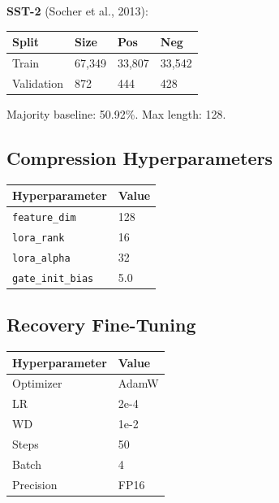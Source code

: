 \textbf{SST-2} (Socher et al., 2013):

\begin{table}[H]
\centering
\small
\begin{tabular}{llll}
\toprule
\textbf{Split} & \textbf{Size} & \textbf{Pos} & \textbf{Neg} \\
\midrule
Train & 67,349 & 33,807 & 33,542 \\
Validation & 872 & 444 & 428 \\
\bottomrule
\end{tabular}
\end{table}

Majority baseline: 50.92\%. Max length: 128.

\subsection{Compression Hyperparameters}

\begin{table}[H]
\centering
\small
\begin{tabular}{ll}
\toprule
\textbf{Hyperparameter} & \textbf{Value} \\
\midrule
\texttt{feature\_dim} & 128 \\
\texttt{lora\_rank} & 16 \\
\texttt{lora\_alpha} & 32 \\
\texttt{gate\_init\_bias} & 5.0 \\
\bottomrule
\end{tabular}
\end{table}

\subsection{Recovery Fine-Tuning}

\begin{table}[H]
\centering
\small
\begin{tabular}{ll}
\toprule
\textbf{Hyperparameter} & \textbf{Value} \\
\midrule
Optimizer & AdamW \\
LR & 2e-4 \\
WD & 1e-2 \\
Steps & 50 \\
Batch & 4 \\
Precision & FP16 \\
\bottomrule
\end{tabular}
\end{table}

